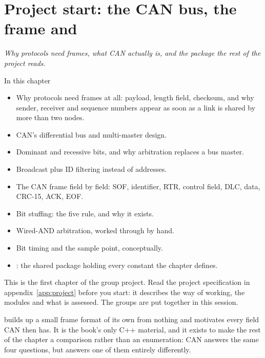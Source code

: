 
\chapter{Project start: the CAN bus, the frame and }
\label{c10:ch}

{\large\itshape Why protocols need frames, what CAN actually is, and the package the rest of the
project reads.\par}

\begin{chapterbox}{In this chapter}
\begin{itemize}
  \item Why protocols need frames at all: payload, length field, checksum, and why sender, receiver
    and sequence numbers appear as soon as a link is shared by more than two nodes.
  \item CAN's differential bus and multi-master design.
  \item Dominant and recessive bits, and why arbitration replaces a bus master.
  \item Broadcast plus ID filtering instead of addresses.
  \item The CAN frame field by field: SOF, identifier, RTR, control field, DLC, data, CRC-15, ACK,
    EOF.
  \item Bit stuffing: the five rule, and why it exists.
  \item Wired-AND arbitration, worked through by hand.
  \item Bit timing and the sample point, conceptually.
  \item {}: the shared package holding every constant the chapter defines.
\end{itemize}
\end{chapterbox}

This is the first chapter of the group project. Read the project specification in
appendix~\ref{app:project} before you start: it describes the way of working, the modules and what is
assessed. The groups are put together in this session.

 builds up a small frame format of its own from nothing and motivates every
field CAN then has. It is the book's only C++ material, and it exists to make the rest of the chapter
a comparison rather than an enumeration: CAN answers the same four questions, but answers one of them
entirely differently.

